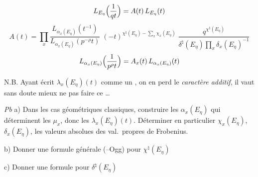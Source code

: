\documentclass[11pt,a4paper]{article}
\begin{document}
\[
  L_{E_\eta}\Bigl(\frac{1}{qt}\Bigr) = A(t)\, L_{E_\eta}(t)
\]
\[
  A(t) = \prod_x \frac{L_{\alpha_x(E_\eta)}(t^{-1})}{L_{\alpha_x(E_\eta)}(p^{-\rho} t)}\;
    (-t)^{\chi^{\natural}(E_\eta) - \sum_x \chi_x(E_\eta)}\;
    \frac{q^{\chi^{\natural}(E_\eta)}}{\delta^{\natural}(E_\eta) \prod_x \delta_x(E_\eta)^{-1}}
\]
\[
  L_{\alpha_x(E_\eta)}\Bigl(\frac{1}{p^{\rho} t}\Bigr) = A_x(t)\, L_{\alpha_x(E_\eta)}(t)
\]

N.B. Ayant écrit $\lambda_x(E_\eta)(t)$ comme un , on en
perd le \emph{caractère additif}, il vaut sans doute mieux ne pas faire ce
 \ldots
{}

\emph{Pb} a) Dans les cas géométriques classiques, construire les
$\alpha_x(E_\eta)$ qui déterminent les $\mu_x$, donc les
$\lambda_x(E_\eta)(t)$. Déterminer en particulier $\chi_x(E_\eta)$,
$\delta_x(E_\eta)$, les valeurs absolues des val.\ propres de Frobenius.

b) Donner une formule générale (--Ogg) pour
$\chi^{\natural}(E_\eta)$

c) Donner une formule pour $\delta^{\natural}(E_\eta)$
\end{document}
